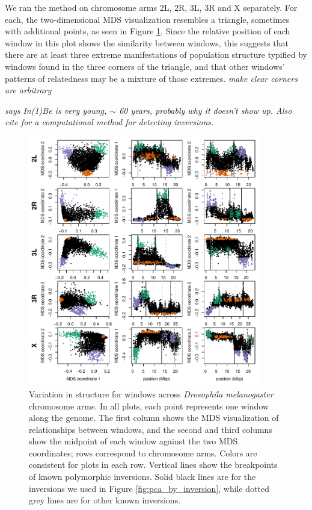 \documentclass[11pt, oneside]{article}   	%
\newcommand{\plr}[1]{{\em \color{blue} #1}}
\begin{document}
We ran the method on chromosome arms 2L, 2R, 3L, 3R and X separately. 
For each, the two-dimensional MDS visualization resembles a triangle,
sometimes with additional points,
as seen in Figure \ref{fig:mds_allchr}.
Since the relative position of each window in this plot shows the similarity between windows, 
this suggests that there are at least three extreme manifestations of population structure 
typified by windows found in the three corners of the triangle,
and that other windows' patterns of relatedness may be a mixture of those extremes. 
\plr{make clear corners are arbitrary}

\plr{\citet{corbett2012population} says In(1)Be is very young, $\sim$ 60 years, probably why it doesn't show up. 
Also cite \citet{corbettdetig2012sequencebased} for a computational method for detecting inversions.}

\begin{figure}
    \begin{center}
       \includegraphics[width=0.9\textwidth]{Fig1_allchr_Together_MDS_plot_compact_with_ChrX_inv}
    \end{center}
    \caption{
        Variation in structure for windows across \textit{Drosophila melanogaster} chromosome arms.
        In all plots, each point represents one window along the genome.
         The first column shows the MDS visualization of relationships between windows, 
         and the second and third columns show the midpoint of each window against the two MDS coordinates; 
         rows correspond to chromosome arms.
         Colors are consistent for plots in each row. 
         Vertical lines show the breakpoints of known polymorphic inversions.   
         Solid black lines are for the inversions we used in Figure \ref{fig:pca_by_inversion},
         while dotted grey lines are for other known inversions.     
         \label{fig:mds_allchr}
    }
\end{figure}
\end{document}
